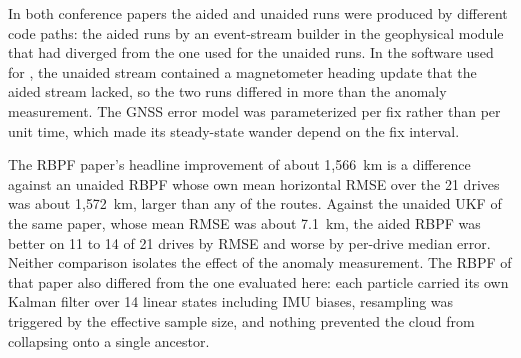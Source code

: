 In both conference papers the aided and unaided runs were produced by different code paths: the aided runs by an event-stream builder in the geophysical module that had diverged from the one used for the unaided runs. In the software used for \citet{anom-pf}, the unaided stream contained a magnetometer heading update that the aided stream lacked, so the two runs differed in more than the anomaly measurement. The GNSS error model was parameterized per fix rather than per unit time, which made its steady-state wander depend on the fix interval.

The RBPF paper's headline improvement of about 1{,}566~km is a difference against an unaided RBPF whose own mean horizontal RMSE over the 21 drives was about 1{,}572~km, larger than any of the routes. Against the unaided UKF of the same paper, whose mean RMSE was about 7.1~km, the aided RBPF was better on 11 to 14 of 21 drives by RMSE and worse by per-drive median error. Neither comparison isolates the effect of the anomaly measurement. The RBPF of that paper also differed from the one evaluated here: each particle carried its own Kalman filter over 14 linear states including IMU biases, resampling was triggered by the effective sample size, and nothing prevented the cloud from collapsing onto a single ancestor.

